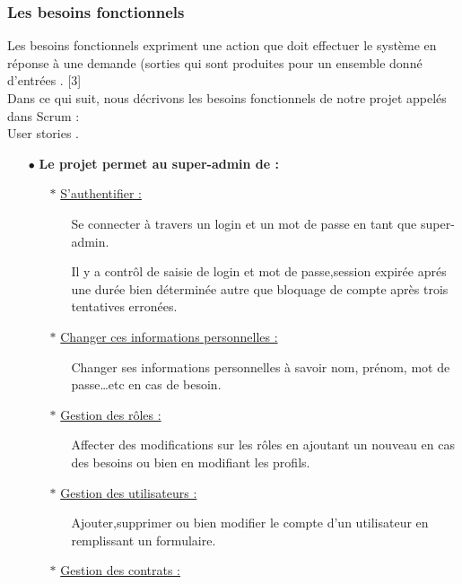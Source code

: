 \documentclass{article}
\begin{document}
\subsubsection{Les besoins fonctionnels}
\guillemotleft Les besoins fonctionnels expriment une action que doit effectuer le système en réponse à une demande (sorties qui sont produites pour un ensemble donné d’entrées \guillemotright. [3] \\
Dans ce qui suit, nous décrivons les besoins fonctionnels de notre projet appelés dans Scrum : \\ \guillemotleft User stories \guillemotright.
\begin{enumerate}
\item [$\bullet$] \textbf{Le projet permet au super-admin de :} 
	\begin{enumerate}
	 \item [$\ast$] \uline{S’authentifier :}
	 	\begin{enumerate}
     		\item [\textendash]Se connecter à travers un login et un mot de passe en tant que super-admin.\\
			\item [\textendash]Il y a contrôl de saisie de login et mot de passe,session expirée aprés une durée bien déterminée autre que bloquage de compte après trois tentatives erronées.
		\end{enumerate}
	\item [$\ast$] \uline{Changer ces informations personnelles :}
		\begin{enumerate}
     		\item [\textendash]Changer ses informations personnelles à savoir nom, prénom, mot de passe…etc en cas de besoin.
		\end{enumerate}
	\item [$\ast$] \uline{Gestion des rôles :}
		\begin{enumerate}
     		\item [\textendash]Affecter des modifications sur les rôles en ajoutant un nouveau en cas des besoins ou bien en modifiant les profils.
		\end{enumerate}    
	\item [$\ast$] \uline{Gestion des utilisateurs :}
		\begin{enumerate}
     		\item [\textendash] Ajouter,supprimer ou bien modifier le compte d'un utilisateur en remplissant un formulaire. 
		\end{enumerate}	
	\item [$\ast$] \uline{Gestion des contrats :}

\end{enumerate}
\end{enumerate}
\end{document}
